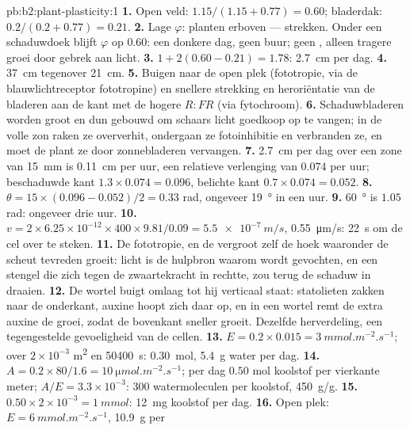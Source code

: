 \begin{solution}{pb:b2:plant-plasticity:1}
\textbf{1.} Open veld: $1.15/(1.15 + 0.77) = 0.60$; bladerdak: $0.2/(0.2 +
0.77) = 0.21$.
\textbf{2.} Lage $\varphi$: planten erboven --- strekken. Onder een
schaduwdoek blijft $\varphi$ op $0.60$: een donkere dag, geen buur; geen
, alleen tragere groei door gebrek aan licht.
\textbf{3.} $1 + 2(0.60 - 0.21) = 1.78$: \qty{2.7}{cm} per dag.
\textbf{4.} \qty{37}{cm} tegenover \qty{21}{cm}.
\textbf{5.} Buigen naar de open plek (fototropie, via de blauwlichtreceptor
fototropine) en snellere strekking en heroriëntatie van de bladeren aan de
kant met de hogere $R{:}FR$ (via fytochroom).
\textbf{6.} Schaduwbladeren worden groot en dun gebouwd om schaars licht
goedkoop op te vangen; in de volle zon raken ze oververhit, ondergaan ze
fotoinhibitie en verbranden ze, en moet de plant ze door zonnebladeren
vervangen.
\textbf{7.} \qty{2.7}{cm} per dag over een zone van \qty{15}{mm} is
\qty{0.11}{cm} per uur, een relatieve verlenging van $0.074$ per uur;
beschaduwde kant $1.3\times 0.074 = 0.096$, belichte kant $0.7\times 0.074 =
0.052$.
\textbf{8.} $\theta = 15\times(0.096 - 0.052)/2 = 0.33$ rad, ongeveer
\qty{19}{\degree} in een uur.
\textbf{9.} \qty{60}{\degree} is $1.05$ rad: ongeveer drie uur.
\textbf{10.} $v = 2\times 6.25\times 10^{-12}\times 400\times
9.81/0.09 = \qty{5.5e-7}{m/s}$, \qty{0.55}{\micro m/s}: \qty{22}{s}
om de cel over te steken.
\textbf{11.} De fototropie, en de  vergroot zelf de hoek
waaronder de scheut tevreden groeit: licht is de hulpbron waarom wordt
gevochten, en een stengel die zich tegen de zwaartekracht in rechtte, zou
terug de schaduw in draaien.
\textbf{12.} De wortel buigt omlaag tot hij verticaal staat: statolieten
zakken naar de onderkant, auxine hoopt zich daar op, en in een wortel remt
de extra auxine de groei, zodat de bovenkant sneller groeit. Dezelfde
herverdeling, een tegengestelde gevoeligheid van de cellen.
\textbf{13.} $E = 0.2\times 0.015 = \qty{3}{mmol.m^{-2}.s^{-1}}$; over
$2\times 10^{-3}$ \unit{m^2} en \qty{50400}{s}: \qty{0.30}{mol},
\qty{5.4}{g} water per dag.
\textbf{14.} $A = 0.2\times 80/1.6 = \qty{10}{\micro mol.m^{-2}.s^{-1}}$;
per dag $0.50$ mol koolstof per vierkante meter; $A/E = 3.3\times
10^{-3}$: 300 watermoleculen per koolstof, \qty{450}{g/g}.
\textbf{15.} $0.50\times 2\times 10^{-3} = \qty{1}{mmol}$: \qty{12}{mg}
koolstof per dag.
\textbf{16.} Open plek: $E = \qty{6}{mmol.m^{-2}.s^{-1}}$, \qty{10.9}{g} per

\end{solution}
